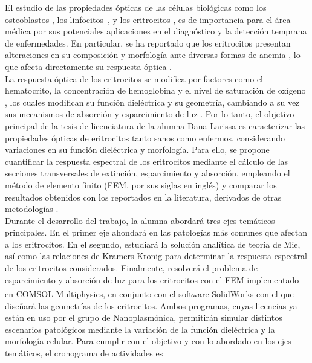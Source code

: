 \documentclass[11pt,letterpaper]{article}
\begin{document}
	El estudio de las propiedades ópticas de las células biológicas como los osteoblastos \cite{antunesOpticalPropertiesBone2019}, los linfocitos~\cite{yoonIdentificationNonactivatedLymphocytes2017}, y los eritrocitos \cite{bosschaartLiteratureReviewNovel2014}, es de importancia para el área médica por sus potenciales aplicaciones en el diagnóstico y la detección temprana de enfermedades.  En particular, se ha reportado que los eritrocitos presentan alteraciones en su composición y morfología ante diversas formas de anemia \cite{bosschaartLiteratureReviewNovel2014}, lo que afecta directamente su respuesta óptica \cite{wriedtLightScatteringSingle2006,meinkeOpticalPropertiesPlatelets2007}.\\
	
	La respuesta óptica de los eritrocitos se modifica por factores como el hematocrito, la concentración de hemoglobina y el nivel de saturación de oxígeno \cite{bosschaartLiteratureReviewNovel2014}, los cuales modifican su función dieléctrica y su geometría, cambiando a su vez sus mecanismos de absorción y esparcimiento de luz \cite{bosschaartLiteratureReviewNovel2014}. Por lo tanto, el objetivo principal de la tesis de licenciatura de la alumna Dana Larissa es caracterizar las propiedades ópticas de eritrocitos tanto sanos como enfermos, considerando variaciones en su función dieléctrica y morfología. Para ello, se propone cuantificar la respuesta espectral de los eritrocitos mediante el cálculo de las secciones transversales de extinción, esparcimiento y absorción, empleando el método de elemento finito (FEM, por sus siglas en inglés) y comparar los resultados obtenidos con los reportados en la literatura, derivados de otras metodologías \cite{ergulComputationalStudyScattering2010,wriedtLightScatteringSingle2006}.\\
	
	Durante el desarrollo del trabajo, la alumna abordará tres ejes temáticos principales. En el primer eje ahondará en las patologías más comunes que afectan a los eritrocitos. En el segundo, estudiará la solución analítica de teoría de Mie, así como las relaciones de Kramers-Kronig \cite{lucariniKramersKronigRelationsOptical2005} para determinar la respuesta espectral de los eritrocitos considerados. Finalmente, resolverá el problema de esparcimiento y absorción de luz para los eritrocitos con el FEM implementado en COMSOL Multiphysics\textsuperscript{\texttrademark}, en conjunto con el software SolidWorks con el que diseñará las geometrías de los eritrocitos.  Ambos programas, cuyas licencias ya están en uso por el grupo de Nanoplasmónica, permitirán simular distintos escenarios patológicos mediante la variación de la función dieléctrica y la morfología celular. Para cumplir con el objetivo y con lo abordado en  los ejes temáticos, el cronograma de actividades es
	
\end{document}
